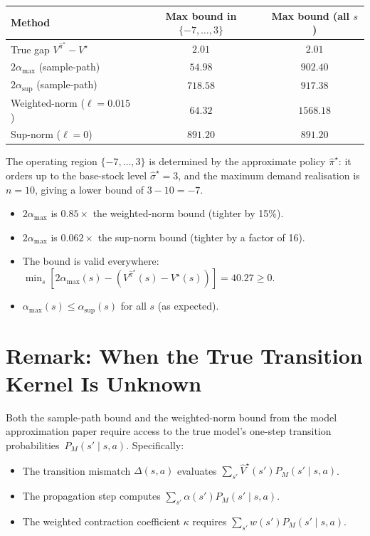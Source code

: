 \documentclass[11pt]{article}
\newcommand{\pihatstar}{\hat\pi^\star}
\newcommand{\Vstar}{V^\star}
\newcommand{\Vhatstar}{\hat V^\star}
\newcommand{\Vpihat}{V^{\pihatstar}}
\begin{document}
\begin{center}
\begin{tabular}{lcc}
\toprule
Method & Max bound in $\{-7,\ldots,3\}$ & Max bound (all $s$) \\
\midrule
True gap $\Vpihat - \Vstar$ & $2.01$ & $2.01$ \\
$2\alpha_{\max}$ (sample-path) & $54.98$ & $902.40$ \\
$2\alpha_{\sup}$ (sample-path) & $718.58$ & $917.38$ \\
Weighted-norm ($\ell = 0.015$) & $64.32$ & $1568.18$ \\
Sup-norm ($\ell = 0$) & $891.20$ & $891.20$ \\
\bottomrule
\end{tabular}
\end{center}

The operating region $\{-7, \ldots, 3\}$ is determined by the approximate policy
$\pihatstar$: it orders up to the base-stock level $\hat\sigma^\star = 3$, and the
maximum demand realisation is $n = 10$, giving a lower bound of $3 - 10 = -7$.

\begin{itemize}
  \item $2\alpha_{\max}$ is $\mathbf{0.85\times}$ the weighted-norm bound
        (tighter by 15\%).
  \item $2\alpha_{\max}$ is $\mathbf{0.062\times}$ the sup-norm bound (tighter
        by a factor of 16).
  \item The bound is valid everywhere: $\min_s [2\alpha_{\max}(s) - (\Vpihat(s)
        - \Vstar(s))] = 40.27 \ge 0$.
  \item $\alpha_{\max}(s) \le \alpha_{\sup}(s)$ for all $s$ (as expected).
\end{itemize}

\section{Remark: When the True Transition Kernel Is Unknown}

Both the sample-path bound and the weighted-norm bound from the model
approximation paper require access to the true model's one-step transition
probabilities~$P_M(s' \mid s, a)$.  Specifically:
\begin{itemize}
  \item The transition mismatch $\Delta(s,a)$ evaluates
        $\sum_{s'} \Vhatstar(s') P_M(s' \mid s, a)$.
  \item The propagation step computes
        $\sum_{s'} \alpha(s') P_M(s' \mid s, a)$.
  \item The weighted contraction coefficient $\kappa$ requires
        $\sum_{s'} w(s') P_M(s' \mid s, a)$.
\end{itemize}
\end{document}

